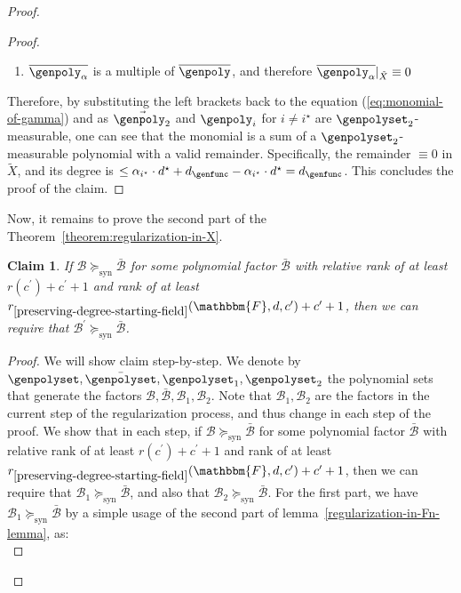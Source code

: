 \documentclass[10pt,a4paper]{article}
\newtheorem{claim}[theorem]{Claim}
\newcommand{\basefield}[0]{\mathbbm{F}}
\newcommand{\degree}[0]{d}
\newcommand{\restrictfunc}[2]{#1|_{#2}}
\newcommand{\factor}[0]{\mathcal{B}}
\newcommand{\synrefine}[0]{\succeq_{\text{syn}}}
\newcommand{\relativeremainder}[1]{\overline{#1}}
\newcommand{\variety}{{\tilde{X}}}
\newcommand{\rankfunc}[0]{{{{r}}}}
\begin{document}
\begin{proof}
\begin{proof}
\begin{enumerate}
            \item $\relativeremainder{\genpoly_{\alpha}}$ is a multiple of $\relativeremainder{\genpoly}$, and therefore $\restrictfunc{\relativeremainder{\genpoly_{\alpha}}}{\variety} \equiv 0$
        \end{enumerate}
        Therefore, by substituting the left brackets back to the equation (\ref{eq:monomial-of-gamma}) and as $\vec{\genpoly_2}$ and $\genpoly_i$ for $i \neq i^{\star}$ are $\genpolyset_2$-measurable,
        one can see that the monomial is a sum of a $\genpolyset_2$-measurable polynomial with a valid remainder.
        Specifically, the remainder $\equiv 0$ in $\variety$, and its degree is $\leq \alpha_{i^\star} \cdot \degree^{\star} + \degree_{\genfunc} - \alpha_{i^\star} \cdot \degree^{\star} = \degree_{\genfunc}$.
        This concludes the proof of the claim.
        \end{proof}
    Now, it remains to prove the second part of the Theorem~{\ref{theorem:regularization-in-X}}.
    \begin{claim}
        If $\factor \synrefine \bar{\factor}$ for some polynomial factor $\bar{\factor}$ with
        relative rank of at least $\rankfunc(c^\prime)+c^\prime+1$ and rank of at least ${\rankfunc_{\ref{preserving-degree-starting-field}}(\basefield, \degree, c^{\prime})} + c^\prime + 1$,
        then we can require that $\factor^\prime \synrefine \bar{\factor}$.
    \end{claim}
    \begin{proof}
        We will show claim step-by-step.
        We denote by $\genpolyset, \bar{\genpolyset}, \genpolyset_1, \genpolyset_2$ the polynomial sets that generate the factors $\factor, \bar{\factor}, \factor_1, \factor_2$.
        Note that $\factor_1, \factor_2$ are the factors in the current step of the regularization process, and thus change in each step of the proof.
        We show that in each step, if $\factor \synrefine \bar{\factor}$ for some polynomial factor $\bar{\factor}$ with
        relative rank of at least $\rankfunc(c^\prime)+c^\prime+1$ and rank of at least ${\rankfunc_{\ref{preserving-degree-starting-field}}(\basefield, \degree, c^{\prime})} + c^\prime + 1$,
        then we can require that $\factor_1 \synrefine \bar{\factor}$, and also that $\factor_2 \synrefine \bar{\factor}$.
        \newline
        For the first part, we have $\factor_1 \synrefine \bar{\factor}$ by a simple usage of the second part of lemma~\ref{regularization-in-Fn-lemma},
        as:
        \[
\]
\end{proof}
\end{proof}
\end{document}
